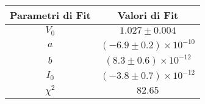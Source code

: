 \begin{tabular}{cc}
\hline
	Parametri di Fit & Valori di Fit\\ 
\hline
	$V_0$ & $1.027\pm0.004$ \\
	$a$ & $(-6.9\pm0.2)\times 10^{-10}$ \\
	$b$ & $(8.3\pm0.6)\times 10^{-12}$ \\
	$I_0$ & $(-3.8\pm0.7)\times 10^{-12}$ \\
	$\chi^2$ & $82.65$ \\
\hline
\end{tabular}

